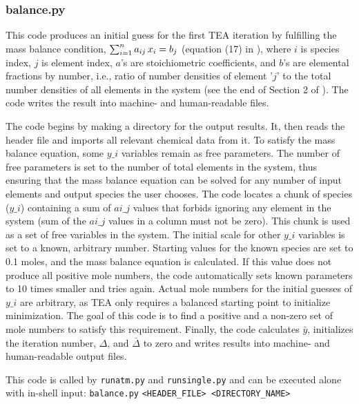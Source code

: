 \subsubsection{balance.py}

This code produces an initial guess for the first TEA iteration by
fulfilling the mass balance condition, $\sum\sb{i=1}^n a\sb{ij}\,
x\sb{i} = b\sb{j}$ (equation (17)
in \citealp{BlecicEtal2015-TEAtheory}), where $i$ is species index,
$j$ is element index, $a$'s are stoichiometric coefficients, and $b$'s
are elemental fractions by number, i.e., ratio of number densities of
element '$j$' to the total number densities of all elements in the
system (see the end of Section 2
of \citealp{BlecicEtal2015-TEAtheory}).  The code writes the result
into machine- and human-readable files.

The code begins by making a directory for the output results. It, then
reads the header file and imports all relevant chemical data from it.
To satisfy the mass balance equation, some $y\_i$ variables remain as
free parameters. The number of free parameters is set to the number of
total elements in the system, thus ensuring that the mass balance
equation can be solved for any number of input elements and output
species the user chooses. The code locates a chunk of species ($y\_i$)
containing a sum of $ai\_j$ values that forbids ignoring any element
in the system (sum of the $ai\_j$ values in a column must not be
zero). This chunk is used as a set of free variables in the
system. The initial scale for other $y\_i$ variables is set to a
known, arbitrary number. Starting values for the known species are set
to 0.1 moles, and the mass balance equation is calculated. If this
value does not produce all positive mole numbers, the code
automatically sets known parameters to 10 times smaller and tries
again. Actual mole numbers for the initial guesses of $y\_i$ are
arbitrary, as TEA only requires a balanced starting point to
initialize minimization. The goal of this code is to find a positive
and a non-zero set of mole numbers to satisfy this
requirement. Finally, the code calculates $\bar{y}$, initializes the
iteration number, $\Delta$, and $\bar{\Delta}$ to zero and writes
results into machine- and human-readable output files.

This code is called by \texttt {runatm.py} and \texttt {runsingle.py}
and can be executed alone with in-shell input: \texttt
{balance.py} \texttt{<HEADER\_FILE> <DIRECTORY\_NAME>}



